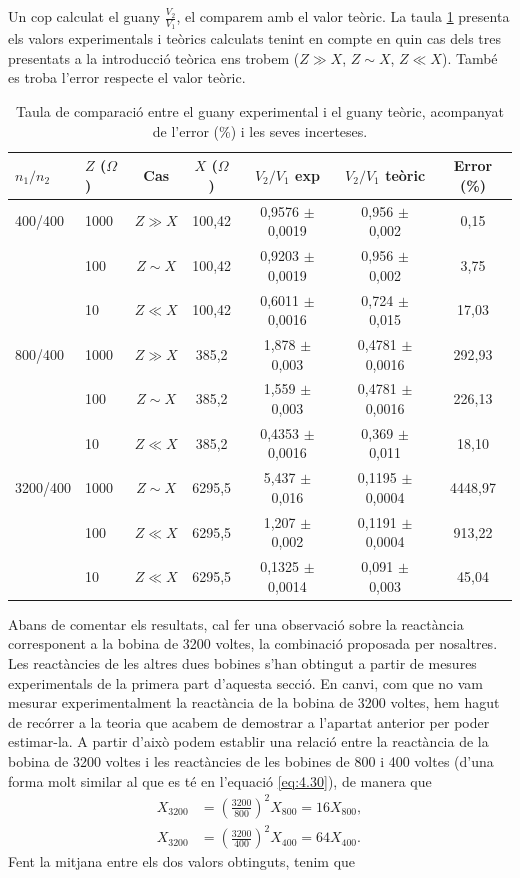\documentclass[a4paper,10.5pt]{report}
\begin{document}
Un cop calculat el guany $\frac{V_2}{V_1}$, el comparem amb el valor teòric. La  taula \ref{tab:4.5} presenta els valors experimentals i teòrics calculats tenint en compte en quin cas dels tres presentats a la introducció teòrica ens trobem ($Z \gg X$, $Z \sim X$, $Z\ll X$). També es troba l'error respecte el valor teòric.  

\begin{table}[H]
	\centering
	\renewcommand{\arraystretch}{1.2}
	\caption{Taula de comparació entre el guany experimental i el guany teòric, acompanyat de l'error (\%) i les seves incerteses.}
	\begin{tabular}{llccccc}
		\toprule
		$n_1/n_2$ & $Z$ ($\Omega$) & Cas & $X$ ($\Omega$) & $V_2/V_1$ exp & $V_2/V_1$ teòric & Error (\%) \\
		\midrule
		400/400 & 1000 & $Z \gg X$ & 100,42 & 0,9576 $\pm$ 0,0019 & 0,956 $\pm$ 0,002 & 0,15 \\
		& 100  & $Z \sim X$ & 100,42 & 0,9203 $\pm$ 0,0019 & 0,956 $\pm$ 0,002 & 3,75 \\
		& 10   & $Z \ll X$ & 100,42 & 0,6011 $\pm$ 0,0016 & 0,724 $\pm$ 0,015 & 17,03 \\
		\midrule
		800/400 & 1000 & $Z \gg X$ & 385,2 & 1,878 $\pm$ 0,003 & 0,4781 $\pm$ 0,0016 & 292,93 \\
		& 100  & $Z \sim X$ & 385,2 & 1,559 $\pm$ 0,003 & 0,4781 $\pm$ 0,0016 & 226,13 \\
		& 10   & $Z \ll X$ & 385,2 & 0,4353 $\pm$ 0,0016 & 0,369 $\pm$ 0,011 & 18,10 \\
		\midrule
		3200/400 & 1000 & $Z \sim X$ & 6295,5 & 5,437 $\pm$ 0,016 & 0,1195 $\pm$ 0,0004 & 4448,97 \\
		& 100  & $Z \ll X$ & 6295,5 & 1,207 $\pm$ 0,002 & 0,1191 $\pm$ 0,0004 & 913,22 \\
		& 10   & $Z \ll X$ & 6295,5 & 0,1325 $\pm$ 0,0014 & 0,091 $\pm$ 0,003 & 45,04 \\
		\bottomrule
	\end{tabular}
	\label{tab:4.5}
\end{table}



Abans de comentar els resultats, cal fer una observació sobre la reactància corresponent a la bobina de 3200 voltes, la combinació proposada per nosaltres. Les reactàncies de les altres dues bobines s'han obtingut a partir de mesures experimentals de la primera part d'aquesta secció. En canvi, com que no vam mesurar experimentalment la reactància de la bobina de 3200 voltes, hem hagut de recórrer a la teoria que acabem de demostrar a l'apartat anterior per poder estimar-la. A partir d'això podem establir una relació entre la reactància de la bobina de 3200 voltes i les reactàncies de les bobines de 800 i 400 voltes (d'una forma molt similar al que es té en l'equació \eqref{eq:4.30}), de manera que
\begin{align*}
	X_{3200}  &= \left(\frac{3200}{800}\right)^2 X_{800} = 16 X_{800},  \\
	X_{3200}  &= \left(\frac{3200}{400}\right)^2 X_{400} = 64 X_{400}. 
\end{align*}
Fent la mitjana entre els dos valors obtinguts, tenim que 
\end{document}
